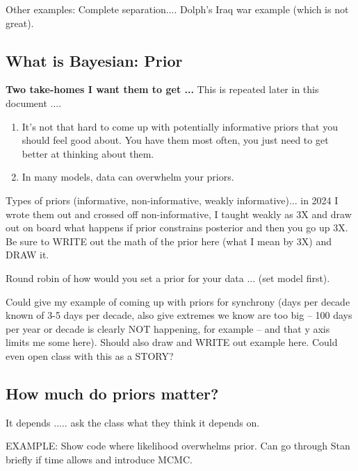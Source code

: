 \documentclass[11pt]{article}
\begin{document}
Other examples: Complete separation.... Dolph's Iraq war example (which is not great).

\subsection{What is Bayesian: Prior}


{\bf Two take-homes I want them to get ...} This is repeated later in this document ....
\begin{enumerate}
\item It's not that hard to come up with potentially informative priors that you should feel good about. You have them most often, you just need to get better at thinking about them.
\item In many models, data can overwhelm your priors. 
\end{enumerate}

Types of priors (informative, non-informative, weakly informative)... in 2024 I wrote them out and crossed off non-informative, I taught weakly as 3X and draw out on board what happens if prior constrains posterior and then you go up 3X. Be sure to WRITE out the math of the prior here (what I mean by 3X) and DRAW it. 

Round robin of how would you set a prior for your data ... (set model first).

Could give my example of coming up with priors for synchrony (days per decade known of 3-5 days per decade, also give extremes we know are too big -- 100 days per year or decade is clearly NOT happening, for example -- and that y axis limits me some here).  Should also draw and WRITE out example here. Could even open class with this as a STORY?

\subsection{How much do priors matter?}
It depends ..... ask the class what they think it depends on.


EXAMPLE: Show code where likelihood overwhelms prior. Can go through Stan briefly if time allows and introduce MCMC. 
\end{document}
